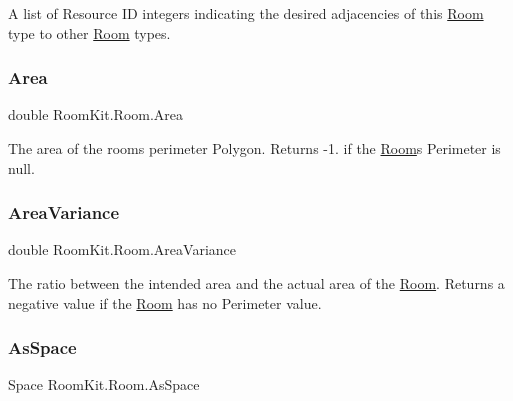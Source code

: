A list of Resource ID integers indicating the desired adjacencies of this \mbox{\hyperlink{class_room_kit_1_1_room}{Room}} type to other \mbox{\hyperlink{class_room_kit_1_1_room}{Room}} types. 

\mbox{\label{class_room_kit_1_1_room_ad4567c8d712d9e6215bda0887148c4d7}} 
\subsubsection{\texorpdfstring{Area}{Area}}
{\footnotesize\ttfamily double Room\+Kit.\+Room.\+Area\hspace{0.3cm}{\ttfamily [get]}}



The area of the room\textquotesingle{}s perimeter Polygon. Returns -\/1. if the \mbox{\hyperlink{class_room_kit_1_1_room}{Room}}\textquotesingle{}s Perimeter is null. 

\mbox{\label{class_room_kit_1_1_room_a236fb97b3f1d4275ba76da3523f94775}} 
\subsubsection{\texorpdfstring{Area\+Variance}{AreaVariance}}
{\footnotesize\ttfamily double Room\+Kit.\+Room.\+Area\+Variance\hspace{0.3cm}{\ttfamily [get]}}



The ratio between the intended area and the actual area of the \mbox{\hyperlink{class_room_kit_1_1_room}{Room}}. Returns a negative value if the \mbox{\hyperlink{class_room_kit_1_1_room}{Room}} has no Perimeter value. 

\mbox{\label{class_room_kit_1_1_room_ada0a8548f538069f902f76534eb91899}} 
\subsubsection{\texorpdfstring{As\+Space}{AsSpace}}
{\footnotesize\ttfamily Space Room\+Kit.\+Room.\+As\+Space\hspace{0.3cm}{\ttfamily [get]}}



